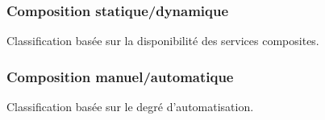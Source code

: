    
      \subsubsection{Composition statique/dynamique}
      \label{sec:comp-stat}
      Classification basée sur la disponibilité des services composites.

      \subsubsection{Composition manuel/automatique}
      \label{sec:comp-manu}
      Classification basée sur le degré d’automatisation.

      
      
      
